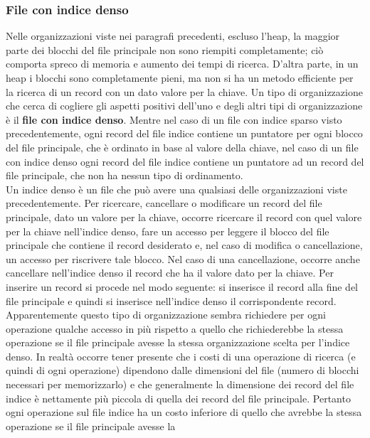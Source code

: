 \subsubsection{File con indice denso}
Nelle organizzazioni viste nei paragrafi precedenti, escluso l'heap, la maggior parte dei blocchi del
file principale non sono riempiti completamente; ciò comporta spreco di memoria e aumento dei
tempi di ricerca. D'altra parte, in un heap i blocchi sono completamente pieni, ma non si ha un
metodo efficiente per la ricerca di un record con un dato valore per la chiave.
Un tipo di organizzazione che cerca di cogliere gli aspetti positivi dell'uno e degli altri tipi di
organizzazione è il \textbf{file con indice denso}. Mentre nel caso di un file con indice sparso visto
precedentemente, ogni record del file indice contiene un puntatore per ogni blocco del file
principale, che è ordinato in base al valore della chiave, nel caso di un file con indice denso ogni
record del file indice contiene un puntatore ad un record del file principale, che non ha nessun tipo
di ordinamento.\\
Un indice denso è un file che può avere una qualsiasi delle organizzazioni viste precedentemente.
Per ricercare, cancellare o modificare un record del file principale, dato un valore per la chiave,
occorre ricercare il record con quel valore per la chiave nell'indice denso, fare un accesso per
leggere il blocco del file principale che contiene il record desiderato e, nel caso di modifica o
cancellazione, un accesso per riscrivere tale blocco. Nel caso di una cancellazione, occorre anche
cancellare nell'indice denso il record che ha il valore dato per la chiave. Per inserire un record si
procede nel modo seguente: si inserisce il record alla fine del file principale e quindi si inserisce
nell'indice denso il corrispondente record.\\
Apparentemente questo tipo di organizzazione sembra richiedere per ogni operazione qualche
accesso in più rispetto a quello che richiederebbe la stessa operazione se il file principale avesse la
stessa organizzazione scelta per l'indice denso. In realtà occorre tener presente che i costi di una
operazione di ricerca (e quindi di ogni operazione) dipendono dalle dimensioni del file (numero di
blocchi necessari per memorizzarlo) e che generalmente la dimensione dei record del file indice è
nettamente più piccola di quella dei record del file principale. Pertanto ogni operazione sul file
indice ha un costo inferiore di quello che avrebbe la stessa operazione se il file principale avesse la
